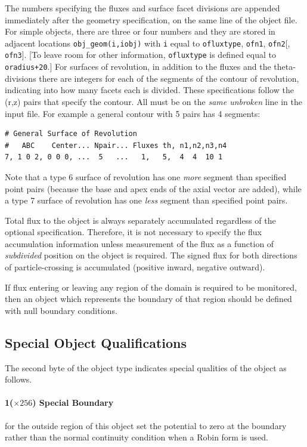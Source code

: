 \documentclass[12pt]{article}
\begin{document}
The numbers specifying the fluxes and surface facet divisions are
appended immediately after the geometry specification, on the same
line of the object file. For simple objects, there are three or four
numbers and they are stored in adjacent locations
\verb!obj_geom(i,iobj)! with \verb!i!  equal to \verb!ofluxtype!,
\verb!ofn1!, \verb!ofn2![, \verb!ofn3!].  [To leave room for other
information, \verb!ofluxtype!  is defined equal to \verb!oradius+20!.]
For surfaces of revolution, in addition to the fluxes and the
theta-divisions there are integers for each of the segments of the
contour of revolution, indicating into how many facets each is
divided. These specifications follow the (r,z) pairs that specify the
contour. All must be on the \emph{same unbroken} line in the
input file. For example a general contour with 5 pairs has 4 segments:
\begin{verbatim}
# General Surface of Revolution
#   ABC    Center... Npair... Fluxes th, n1,n2,n3,n4
7, 1 0 2, 0 0 0, ...  5   ...   1,   5,  4  4  10 1 
\end{verbatim}
Note that a type 6 surface of revolution has one \emph{more} segment
than specified point pairs (because the base and apex ends of the
axial vector are added), while a type 7 surface of revolution has one
\emph{less} segment than specified point pairs. 

Total flux to the object is always separately accumulated regardless
of the optional specification.  Therefore, it is not necessary to
specify the flux accumulation information unless measurement of the
flux as a function of \emph{subdivided} position on the object is
required. The signed flux for both directions of particle-crossing
is accumulated (positive inward, negative outward). 

If flux entering or leaving any region of the domain is required to be
monitored, then an object which represents the boundary of that region
should be defined with null boundary conditions. 

\subsection{Special Object Qualifications}

The second byte of the object type indicates special qualities of the
object as follows. 

\paragraph{1($\times256$) Special Boundary} for the outside region of this
object set the potential to zero at the boundary rather than the
normal continuity condition when a Robin form is used.
\end{document}
